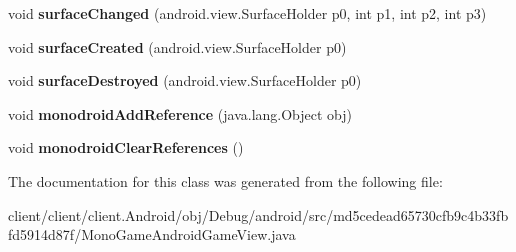 \begin{DoxyCompactItemize}
\item 
\hypertarget{classmd5cedead65730cfb9c4b33fbfd5914d87f_1_1MonoGameAndroidGameView_a5479f59247584fb389d00d2ec86353fa}{}void {\bfseries surface\+Changed} (android.\+view.\+Surface\+Holder p0, int p1, int p2, int p3)\label{classmd5cedead65730cfb9c4b33fbfd5914d87f_1_1MonoGameAndroidGameView_a5479f59247584fb389d00d2ec86353fa}

\item 
\hypertarget{classmd5cedead65730cfb9c4b33fbfd5914d87f_1_1MonoGameAndroidGameView_a201807a2fb9f748d20fd0676c0a66aa1}{}void {\bfseries surface\+Created} (android.\+view.\+Surface\+Holder p0)\label{classmd5cedead65730cfb9c4b33fbfd5914d87f_1_1MonoGameAndroidGameView_a201807a2fb9f748d20fd0676c0a66aa1}

\item 
\hypertarget{classmd5cedead65730cfb9c4b33fbfd5914d87f_1_1MonoGameAndroidGameView_a934e10bc29c2b77cb1a43943842f2ac2}{}void {\bfseries surface\+Destroyed} (android.\+view.\+Surface\+Holder p0)\label{classmd5cedead65730cfb9c4b33fbfd5914d87f_1_1MonoGameAndroidGameView_a934e10bc29c2b77cb1a43943842f2ac2}

\item 
\hypertarget{classmd5cedead65730cfb9c4b33fbfd5914d87f_1_1MonoGameAndroidGameView_a9852c786e3d122fe95492bec8ba7af56}{}void {\bfseries monodroid\+Add\+Reference} (java.\+lang.\+Object obj)\label{classmd5cedead65730cfb9c4b33fbfd5914d87f_1_1MonoGameAndroidGameView_a9852c786e3d122fe95492bec8ba7af56}

\item 
\hypertarget{classmd5cedead65730cfb9c4b33fbfd5914d87f_1_1MonoGameAndroidGameView_a643c902e32f28865fb16da62411e8208}{}void {\bfseries monodroid\+Clear\+References} ()\label{classmd5cedead65730cfb9c4b33fbfd5914d87f_1_1MonoGameAndroidGameView_a643c902e32f28865fb16da62411e8208}

\end{DoxyCompactItemize}


The documentation for this class was generated from the following file\+:\begin{DoxyCompactItemize}
\item 
client/client/client.\+Android/obj/\+Debug/android/src/md5cedead65730cfb9c4b33fbfd5914d87f/Mono\+Game\+Android\+Game\+View.\+java\end{DoxyCompactItemize}
